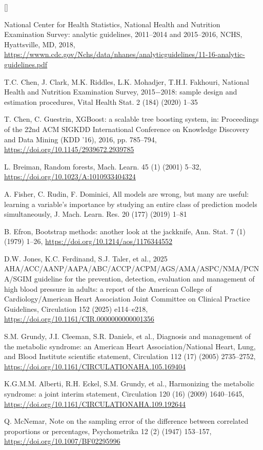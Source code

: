 \documentclass[9pt,a4paper]{extarticle}
\newcounter{refc}
\begin{document}
{\begin{list}{[]}{\setlength{\leftmargin}{2.2em}\setlength{\labelwidth}{2em}\setlength{\itemsep}{0.5pt}\setlength{\parsep}{0pt}}
\item National Center for Health Statistics, National Health and Nutrition Examination Survey: analytic guidelines, 2011–2014 and 2015–2016, NCHS, Hyattsville, MD, 2018, \url{https://wwwn.cdc.gov/Nchs/data/nhanes/analyticguidelines/11-16-analytic-guidelines.pdf}
\item T.C. Chen, J. Clark, M.K. Riddles, L.K. Mohadjer, T.H.I. Fakhouri, National Health and Nutrition Examination Survey, 2015−2018: sample design and estimation procedures, Vital Health Stat. 2 (184) (2020) 1–35
\item T. Chen, C. Guestrin, XGBoost: a scalable tree boosting system, in: Proceedings of the 22nd ACM SIGKDD International Conference on Knowledge Discovery and Data Mining (KDD ’16), 2016, pp. 785–794, \url{https://doi.org/10.1145/2939672.2939785}
\item L. Breiman, Random forests, Mach. Learn. 45 (1) (2001) 5–32, \url{https://doi.org/10.1023/A:1010933404324}
\item A. Fisher, C. Rudin, F. Dominici, All models are wrong, but many are useful: learning a variable’s importance by studying an entire class of prediction models simultaneously, J. Mach. Learn. Res. 20 (177) (2019) 1–81
\item B. Efron, Bootstrap methods: another look at the jackknife, Ann. Stat. 7 (1) (1979) 1–26, \url{https://doi.org/10.1214/aos/1176344552}
\item D.W. Jones, K.C. Ferdinand, S.J. Taler, et al., 2025 AHA/ACC/AANP/AAPA/ABC/ACCP/ACPM/AGS/AMA/ASPC/NMA/PCNA/SGIM guideline for the prevention, detection, evaluation and management of high blood pressure in adults: a report of the American College of Cardiology/American Heart Association Joint Committee on Clinical Practice Guidelines, Circulation 152 (2025) e114–e218, \url{https://doi.org/10.1161/CIR.0000000000001356}
\item S.M. Grundy, J.I. Cleeman, S.R. Daniels, et al., Diagnosis and management of the metabolic syndrome: an American Heart Association/National Heart, Lung, and Blood Institute scientific statement, Circulation 112 (17) (2005) 2735–2752, \url{https://doi.org/10.1161/CIRCULATIONAHA.105.169404}
\item K.G.M.M. Alberti, R.H. Eckel, S.M. Grundy, et al., Harmonizing the metabolic syndrome: a joint interim statement, Circulation 120 (16) (2009) 1640–1645, \url{https://doi.org/10.1161/CIRCULATIONAHA.109.192644}
\item Q. McNemar, Note on the sampling error of the difference between correlated proportions or percentages, Psychometrika 12 (2) (1947) 153–157, \url{https://doi.org/10.1007/BF02295996}

\end{list}}
\end{document}

